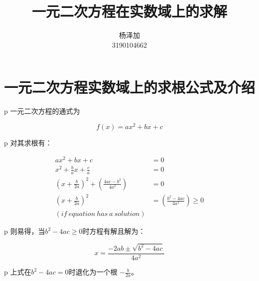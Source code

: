 \documentclass{ctexart}
\title{一元二次方程在实数域上的求解}
\author{杨泽加 \\ 3190104662}
\begin{document}
    \maketitle
    \section{一元二次方程实数域上的求根公式及介绍}
    \begin{tabular}{p\columnwidth}
        一元二次方程的通式为
    \end{tabular}
    \begin{equation}\label{E1}
        f(x) = ax^2 + bx + c
    \end{equation}
    \begin{tabular}{p\columnwidth}
        对其求根有：
    \end{tabular}
    \begin{equation}\label{E2}
        \begin{aligned}
            ax^2 + bx + c &= 0\\
            x^2 + \frac{b}{a}x + \frac{c}{a} &= 0\\
            (x + \frac{b}{2a})^2 + (\frac{4ac - b^2}{4a^2}) &= 0\\
            (x + \frac{b}{2a})^2 &= (\frac{b^2 - 4ac}{4a^2}) \geqslant 0\\
            (if\ equation\ has\ a\ solution)
        \end{aligned}
    \end{equation}
    \begin{tabular}{p\columnwidth}
        则易得，当$ b^2 - 4ac \geqslant 0 $时方程有解且解为：
    \end{tabular}
    \begin{equation}\label{E3}
        x = \frac{-2ab \pm \sqrt {b^2 - 4ac}}{4a^2}
    \end{equation}
    \begin{tabular}{p\columnwidth}
        上式在$ b^2 - 4ac=0 $时退化为一个根 $-\frac{b}{2a}$。
    \end{tabular}
\end{document}
